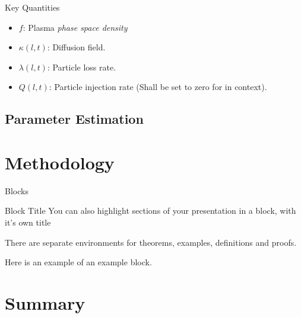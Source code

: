 \documentclass{beamer}
\begin{document}
\begin{frame}{Key Quantities}
  \begin{itemize}
  \item {
      $f$: Plasma \emph{phase space density}
    \pause %
  }
  \item {   
      $\kappa(l, t)$: Diffusion field.
  }
  \item<3-> {
    $\lambda(l, t)$: Particle loss rate.
  }
  \item<4-> {
      $Q(l, t)$: Particle injection rate (Shall be set to zero for
      in context).
  }
  \end{itemize}
\end{frame}

\subsection{Parameter Estimation}


\section{Methodology}



\begin{frame}{Blocks}
\begin{block}{Block Title}
You can also highlight sections of your presentation in a block, with it's own title
\end{block}
\begin{theorem}
There are separate environments for theorems, examples, definitions and proofs.
\end{theorem}
\begin{example}
Here is an example of an example block.
\end{example}
\end{frame}

\section*{Summary}
\end{document}

